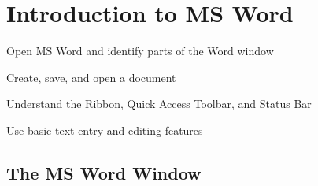\chapter{Introduction to MS Word}
\label{ch:word-intro}

\begin{objectives}
  \item Open MS Word and identify parts of the Word window
  \item Create, save, and open a document
  \item Understand the Ribbon, Quick Access Toolbar, and Status Bar
  \item Use basic text entry and editing features
\end{objectives}


\section{The MS Word Window}
\label{sec:word-window}

